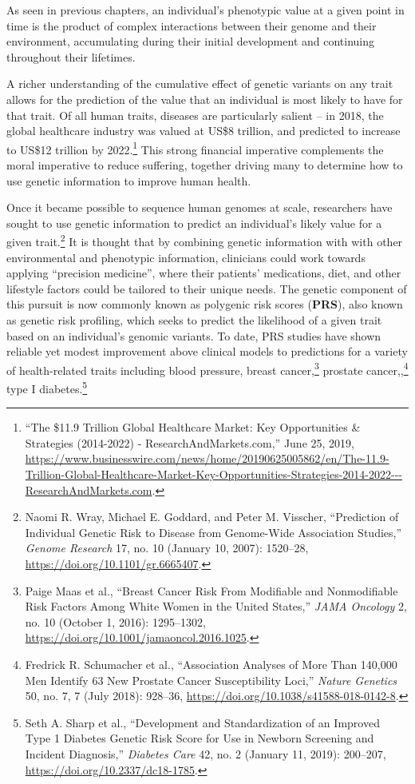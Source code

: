 \documentclass[
  9pt,
]{book}
\begin{document}
As seen in previous chapters, an individual's phenotypic value at a given point in time is the product of complex interactions between their genome and their environment, accumulating during their initial development and continuing throughout their lifetimes.

A richer understanding of the cumulative effect of genetic variants on any trait allows for the prediction of the value that an individual is most likely to have for that trait. Of all human traits, diseases are particularly salient -- in 2018, the global healthcare industry was valued at US\$8 trillion, and predicted to increase to US\$12 trillion by 2022.\footnote{{``The \$11.9 {Trillion Global Healthcare Market}: {Key Opportunities} \& {Strategies} (2014-2022) - {ResearchAndMarkets}.com,''} June 25, 2019, \url{https://www.businesswire.com/news/home/20190625005862/en/The-11.9-Trillion-Global-Healthcare-Market-Key-Opportunities-Strategies-2014-2022---ResearchAndMarkets.com}.} This strong financial imperative complements the moral imperative to reduce suffering, together driving many to determine how to use genetic information to improve human health.

Once it became possible to sequence human genomes at scale, researchers have sought to use genetic information to predict an individual's likely value for a given trait.\footnote{Naomi R. Wray, Michael E. Goddard, and Peter M. Visscher, {``Prediction of Individual Genetic Risk to Disease from Genome-Wide Association Studies,''} \emph{Genome Research} 17, no. 10 (January 10, 2007): 1520--28, \url{https://doi.org/10.1101/gr.6665407}.} It is thought that by combining genetic information with with other environmental and phenotypic information, clinicians could work towards applying ``precision medicine'', where their patients' medications, diet, and other lifestyle factors could be tailored to their unique needs. The genetic component of this pursuit is now commonly known as polygenic risk scores (\textbf{PRS}), also known as genetic risk profiling, which seeks to predict the likelihood of a given trait based on an individual's genomic variants. To date, PRS studies have shown reliable yet modest improvement above clinical models to predictions for a variety of health-related traits including blood pressure, breast cancer,\footnote{Paige Maas et al., {``Breast {Cancer Risk From Modifiable} and {Nonmodifiable Risk Factors Among White Women} in the {United States},''} \emph{JAMA Oncology} 2, no. 10 (October 1, 2016): 1295--1302, \url{https://doi.org/10.1001/jamaoncol.2016.1025}.} prostate cancer,,\footnote{Fredrick R. Schumacher et al., {``Association Analyses of More Than 140,000 Men Identify 63 New Prostate Cancer Susceptibility Loci,''} \emph{Nature Genetics} 50, no. 7, 7 (July 2018): 928--36, \url{https://doi.org/10.1038/s41588-018-0142-8}.} type I diabetes.\footnote{Seth A. Sharp et al., {``Development and {Standardization} of an {Improved Type} 1 {Diabetes Genetic Risk Score} for {Use} in {Newborn Screening} and {Incident Diagnosis},''} \emph{Diabetes Care} 42, no. 2 (January 11, 2019): 200--207, \url{https://doi.org/10.2337/dc18-1785}.}
\end{document}
